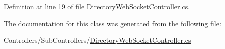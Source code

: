 Definition at line 19 of file Directory\+Web\+Socket\+Controller.\+cs.



The documentation for this class was generated from the following file\+:\begin{DoxyCompactItemize}
\item 
Controllers/\+Sub\+Controllers/\mbox{\hyperlink{_directory_web_socket_controller_8cs}{Directory\+Web\+Socket\+Controller.\+cs}}\end{DoxyCompactItemize}
